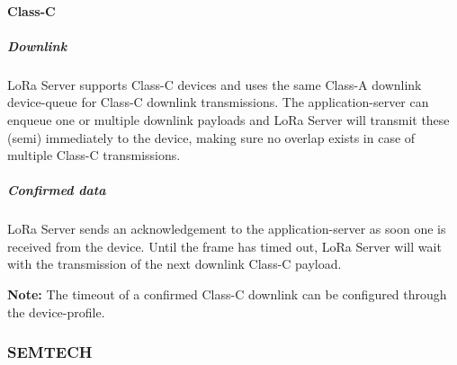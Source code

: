 
\paragraph{Class-C}

\subparagraph{Downlink}
LoRa Server supports Class-C devices and uses the same Class-A downlink device-queue for Class-C downlink transmissions.
The application-server can enqueue one or multiple downlink payloads and LoRa Server will transmit these (semi) immediately to the device,
	making sure no overlap exists in case of multiple Class-C transmissions.

\subparagraph{Confirmed data}
LoRa Server sends an acknowledgement to the application-server as soon one is received from the device.
Until the frame has timed out,
	LoRa Server will wait with the transmission of the next downlink Class-C payload.

\textbf{Note:} The timeout of a confirmed Class-C downlink can be configured through the device-profile.




\subsubsection{SEMTECH}



